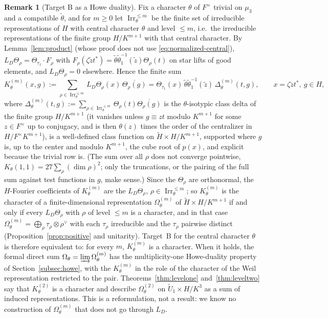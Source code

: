 \documentclass[11pt]{article}
\newcommand{\Irr}{\operatorname{Irr}}
\newcommand{\tH}{\widetilde H}
\newcommand{\tU}{\widetilde U}
\newcommand{\tth}{\widetilde\theta}
\theoremstyle{plain}
\theoremstyle{definition}
\newtheorem{remark}[theorem]{Remark}
\begin{document}
\begin{remark}[Target B as a Howe duality]\label{rem:howe-duality}
Fix a character $\theta$ of $F^\times$ trivial on $\mu_3$ and a
compatible $\tth$, and for $m\ge0$ let $\Irr_\theta^{\le m}$ be the
finite set of irreducible representations of $H$ with central character
$\theta$ and level $\le m$, i.e.\ the irreducible representations of
the finite group $H/K^{m+1}$ with that central character.  By
Lemma~\ref{lem:product} (whose proof does not use
\eqref{eq:normalized-central}), $L_D\Theta_\rho=\Theta_{\tau_1}\cdot F_\rho$
with $F_\rho(\zeta\tilde zt^*)=\tth\tth_1^{-1}(\tilde z)\Theta_\rho(t)$ on
star lifts of good elements, and $L_D\Theta_\rho=0$ elsewhere.  Hence
the finite sum
\[
 K_\theta^{(m)}(x,g):=\sum_{\rho\in\Irr_\theta^{\le m}}L_D\Theta_\rho(x)\,\overline{\Theta_\rho(g)}
 =\Theta_{\tau_1}(x)\,\tth\tth_1^{-1}(\tilde z)\,\Delta^{(m)}_\theta(t,g),\qquad x=\zeta\tilde zt^*,\ g\in H,
\]
where $\Delta^{(m)}_\theta(t,g):=\sum_{\rho\in\Irr_\theta^{\le m}}\Theta_\rho(t)\overline{\Theta_\rho(g)}$
is the $\theta$-isotypic class delta of the finite group $H/K^{m+1}$
(it vanishes unless $g\equiv zt$ modulo $K^{m+1}$ for some $z\in F^\times$
up to conjugacy, and is then $\theta(z)$ times the order of the
centralizer in $H/F^\times K^{m+1}$), is a well-defined class function on
$\tH\times H/K^{m+1}$, supported where $g$ is, up to the center and
modulo $K^{m+1}$, the cube root of $p(x)$, and explicit because the
trivial row is.  (The sum over all $\rho$ does not converge pointwise,
$K_\theta(1,1)=27\sum_\rho(\dim\rho)^2$; only the truncations, or the
pairing of the full sum against test functions in $g$, make sense.)
Since the $\Theta_\rho$ are orthonormal, the $H$-Fourier coefficients of
$K^{(m)}_\theta$ are the $L_D\Theta_\rho$, $\rho\in\Irr_\theta^{\le m}$;
so $K_\theta^{(m)}$ is the character of a finite-dimensional
representation $\Omega^{(m)}_\theta$ of $\tH\times H/K^{m+1}$ if and only
if every $L_D\Theta_\rho$ with $\rho$ of level $\le m$ is a character,
and in that case $\Omega^{(m)}_\theta=\bigoplus_{\rho}\tau_\rho\otimes\rho^\vee$
with each $\tau_\rho$ irreducible and the $\tau_\rho$ pairwise distinct
(Proposition~\ref{prop:positive} and unitarity).  Target~B for the
central character $\theta$ is therefore equivalent to: for every $m$,
$K^{(m)}_\theta$ is a character.  When it holds, the formal direct sum
$\Omega_\theta=\varinjlim\Omega^{(m)}_\theta$ has the multiplicity-one
Howe-duality property of Section~\ref{subsec:howe}, with the
$K^{(m)}_\theta$ in the role of the character of the Weil representation
restricted to the pair.  Theorems~\ref{thm:levelone} and~\ref{thm:leveltwo}
say that $K^{(2)}_\theta$ is a character and describe
$\Omega^{(2)}_\theta$ on $\tU_1\times H/K^3$ as a sum of induced
representations.  This is a reformulation, not a result: we know no
construction of $\Omega^{(m)}_\theta$ that does not go through $L_D$.
\end{remark}
\end{document}

